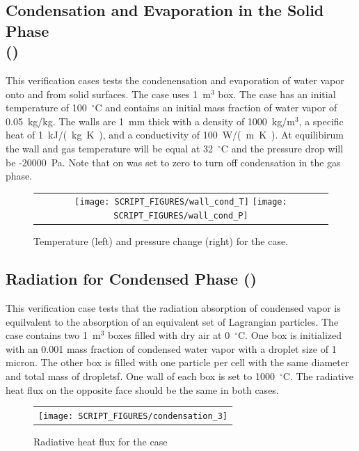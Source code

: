 \documentclass[11pt]{book}
\begin{document}
\subsection{Condensation and Evaporation in the Solid Phase\\(\texorpdfstring{}{wall\_cond})}
    \label{wall_condensation_evaporation}
This verification cases tests the condenensation and evaporation of water vapor onto and from solid surfaces. The case uses 1~m$^3$ box. The case has an initial temperature of 100~$^\circ$C and contains an initial mass fraction of water vapor of 0.05~kg/kg. The walls are 1~mm thick with a density of 1000~kg/m$^3$, a specific heat of 1~\si{kJ/(kg.K)}, and a conductivity of 100~\si{W/(m.K)}. At equilibirum the wall and gas temperature will be equal at 32~$^\circ$C and the pressure drop will be -20000~Pa. Note that  on  was set to zero to turn off condensation in the gas phase.

\begin{figure}[ht]
    \centering
    \begin{tabular}{c}
        \texttt{[image: SCRIPT\_FIGURES/wall\_cond\_T]}
        \texttt{[image: SCRIPT\_FIGURES/wall\_cond\_P]}
    \end{tabular}
    \caption[Results of the   case]{Temperature (left) and pressure change (right) for the  case.}
    \label{fig:wall_condensation}
\end{figure}


\subsection{Radiation for Condensed Phase (\texorpdfstring{} {condensation\_3})}
\label{condensation_radiation}
This verification case tests that the radiation absorption of condensed vapor is equilvalent to the absorption of an equivalent set of Lagrangian particles. The case contains two 1~m$^3$ boxes filled with dry air at 0~$^\circ$C. One box is initialized with an 0.001 mass fraction of condensed water vapor with a droplet size of 1 micron. The other box is filled with one particle per cell with the same diameter and total mass of dropletsf. One wall of each box is set to 1000~$^\circ$C. The radiative heat flux on the opposite face should be the same in both cases.

\begin{figure}[ht]
\centering
\begin{tabular}{c}
\texttt{[image: SCRIPT\_FIGURES/condensation\_3]}
\end{tabular}
\caption[Radiative heat flux for the  case]{Radiative heat flux for the  case}
\label{fig:condensation_3}
\end{figure}
\end{document}
